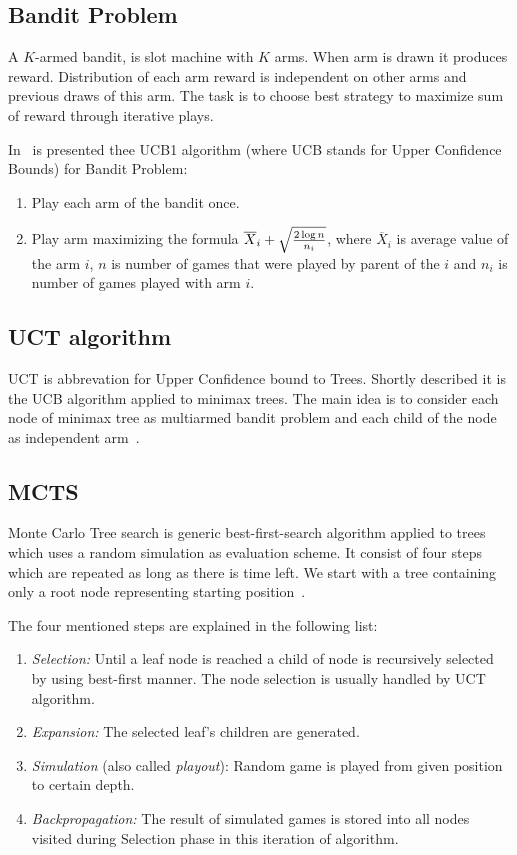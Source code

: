 \subsection{Bandit Problem}
A $K$-armed bandit, is slot machine with $K$ arms. When arm is drawn it
produces reward. Distribution of each arm reward is independent on other arms
and previous draws of this arm. The task is to choose best strategy to maximize
sum of reward through iterative plays.~\cite{MoGo,MultiarmedBandit}

In~\cite{MultiarmedBandit} is presented thee UCB1 algorithm (where UCB stands for Upper Confidence Bounds) for Bandit Problem:

\begin{enumerate}
\item Play each arm of the bandit once.
\item Play arm maximizing the formula $\overline X_i + \sqrt{2 \log n \over n_i}$,
	  where $\overline X_i$ is average value of the arm $i$, $n$ is number
	  of games that were played by parent of the $i$ and $n_i$ is number of
	  games played with arm $i$.
\end{enumerate}


\subsection{UCT algorithm}
UCT is abbrevation for  Upper Confidence bound to Trees. Shortly described it
is the UCB algorithm applied to minimax trees. The main idea is to consider
each node of minimax tree as multiarmed bandit problem and each child of the
node as independent arm~\cite{MoGo}.


\subsection{MCTS}
Monte Carlo Tree search is generic best-first-search algorithm applied to
trees which uses a random simulation as evaluation scheme. It consist of four
steps which are repeated as long as there is time left. We start with a tree
containing only a root node representing starting
position~\cite{progressive-strategies,KOZELEK}.

The four mentioned steps are explained in the following list:

\begin{enumerate}
\item \emph{Selection:} Until a leaf node is reached a child of node is
recursively selected by using best-first manner. The node selection is usually
handled by UCT algorithm.
\item \emph{Expansion:} The selected leaf's children are generated.
\item \emph{Simulation} (also called \emph{playout}): Random game is played
from given position to certain depth.
\item \emph{Backpropagation:} The result of simulated games is stored into all
nodes visited during Selection phase in this iteration of algorithm.
\end{enumerate}

